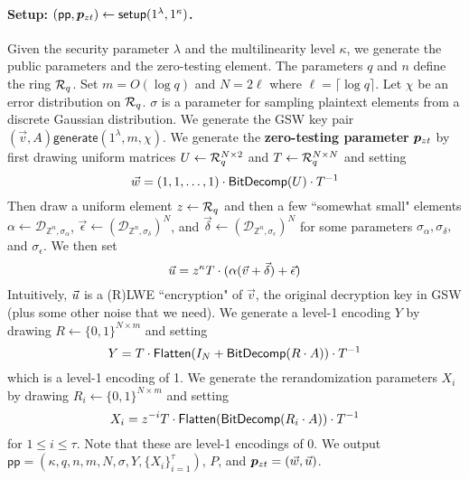 \paragraph{Setup: $(\mathsf{pp},\bm{p}_{zt}) \leftarrow \mathsf{setup}(1^\lambda, 1^\kappa)$.}  Given the security parameter $\lambda$ and the multilinearity level $\kappa$, we generate the public parameters and the zero-testing element.  The parameters $q$ and $n$ define the ring $\mathcal{R}_q$.  Set $m = O(\log q)$ and $N = 2\ell$ where $\ell = \lceil \log q \rceil$.  Let $\chi$ be an error distribution on $\mathcal{R}_q$.  $\sigma$ is a parameter for sampling plaintext elements from a discrete Gaussian distribution.  We generate the GSW key pair $(\vec{v},A) \mathsf{generate}(1^\lambda,m, \chi)$.  We generate the {\bf zero-testing parameter} $\bm{p}_{zt}$ by first drawing uniform matrices $U \leftarrow \mathcal{R}_q^{N\times 2}$ and $T \leftarrow \mathcal{R}_q^{N \times N}$ and setting $$\vec{w} = (1,1,\ldots,1)\cdot \mathsf{BitDecomp}(U)\cdot T^{-1}$$  Then draw a uniform element $z \leftarrow \mathcal{R}_q$ and then a few ``somewhat small" elements $\alpha \leftarrow \mathcal{D}_{\mathbb{Z}^n, \sigma_\alpha}$, $\vec{\epsilon} \leftarrow (\mathcal{D}_{\mathbb{Z}^n, \sigma_\delta})^N$, and $\vec{\delta} \leftarrow (\mathcal{D}_{\mathbb{Z}^n, \sigma_\epsilon})^N$ for some parameters $\sigma_\alpha, \sigma_\delta,$ and $\sigma_\epsilon$.  We then set $$\vec{u} = z^\kappa T\cdot (\alpha(\vec{v} + \vec{\delta}) + \vec{\epsilon})$$  Intuitively, $\vec{u}$ is a (R)LWE ``encryption" of $\vec{v}$, the original decryption key in GSW (plus some other noise that we need).  We generate a level-1 encoding $Y$ by drawing $R \leftarrow \{0,1\}^{N\times m}$ and setting $$Y = T\cdot\mathsf{Flatten}(I_N + \mathsf{BitDecomp}(R\cdot A))\cdot T^{-1}$$  which is a level-1 encoding of 1. We generate the rerandomization parameters $X_i$ by drawing $R_i \leftarrow \{0,1\}^{N \times m}$ and setting $$X_i = z^{-i}T\cdot\mathsf{Flatten}(\mathsf{BitDecomp}(R_i\cdot A))\cdot T^{-1}$$ for $1 \leq i \leq \tau$.  Note that these are level-1 encodings of 0. We output $\mathsf{pp} = (\kappa, q,n,m,N,\sigma, Y, \{X_i\}_{i=1}^\tau)$, $P$, and $\bm{p}_{zt} = (\vec{w},\vec{u})$.

